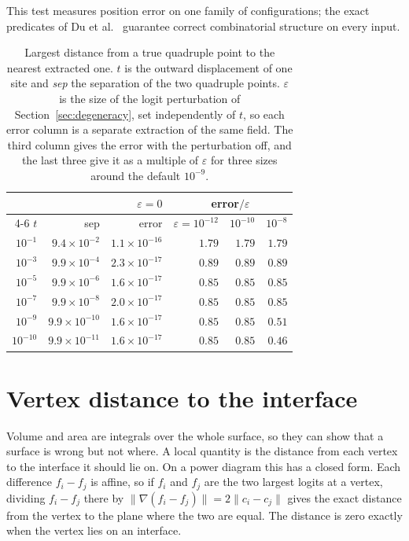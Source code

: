 \documentclass[11pt]{article}
\theoremstyle{definition}
\begin{document}
This test measures position error on one family of configurations; the exact
predicates of Du et al.~\cite{du2022} guarantee correct combinatorial
structure on every input.

\begin{table}[htbp]
\centering
\caption{Largest distance from a true quadruple point to the nearest
extracted one. $t$ is the outward displacement of one site and
\emph{sep} the separation of the two quadruple points.
$\varepsilon$ is the size of the logit perturbation of
Section~\ref{sec:degeneracy}, set independently
of $t$, so each error column is a separate extraction of the same field. The
third column gives the error with the perturbation off, and the last three
give it as a multiple of $\varepsilon$ for three sizes around the default
$10^{-9}$.}
\label{tab:degeneracy}
\begin{tabular}{@{}rrrrrr@{}}
\toprule
& & $\varepsilon=0$ & \multicolumn{3}{c}{error$/\varepsilon$} \\
\cmidrule(l){4-6}
$t$ & sep & error & $\varepsilon=10^{-12}$ & $10^{-10}$ & $10^{-8}$ \\
\midrule
$10^{-1}$  & $9.4\!\times\!10^{-2}$  & $1.1\!\times\!10^{-16}$ & $1.79$ & $1.79$ & $1.79$ \\
$10^{-3}$  & $9.9\!\times\!10^{-4}$  & $2.3\!\times\!10^{-17}$ & $0.89$ & $0.89$ & $0.89$ \\
$10^{-5}$  & $9.9\!\times\!10^{-6}$  & $1.6\!\times\!10^{-17}$ & $0.85$ & $0.85$ & $0.85$ \\
$10^{-7}$  & $9.9\!\times\!10^{-8}$  & $2.0\!\times\!10^{-17}$ & $0.85$ & $0.85$ & $0.85$ \\
$10^{-9}$  & $9.9\!\times\!10^{-10}$ & $1.6\!\times\!10^{-17}$ & $0.85$ & $0.85$ & $0.51$ \\
$10^{-10}$ & $9.9\!\times\!10^{-11}$ & $1.6\!\times\!10^{-17}$ & $0.85$ & $0.85$ & $0.46$ \\
\bottomrule
\end{tabular}
\end{table}

\section{Vertex distance to the interface}
\label{sec:pointwise-supp}

Volume and area are integrals over the whole surface, so they can show that
a surface is wrong but not where. A local quantity is
the distance from each vertex to the interface it should lie on. On a power
diagram this has a closed form. Each difference $f_i - f_j$ is affine, so if
$f_i$ and $f_j$ are the two largest logits at a vertex, dividing $f_i - f_j$
there by $\lVert\nabla(f_i-f_j)\rVert = 2\lVert c_i - c_j\rVert$ gives the
exact distance from the vertex to the plane where the two are equal. The
distance is zero exactly when the vertex lies on an interface.
\end{document}
